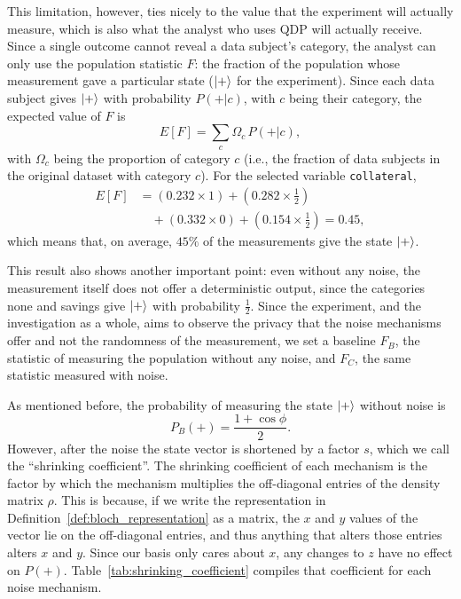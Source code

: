 \documentclass{ieeeaccess}
\begin{document}
This limitation, however, ties nicely to the value that the experiment will actually measure, which is also what the analyst who uses QDP will actually receive. Since a single outcome cannot reveal a data subject's category, the analyst can only use the population statistic $F$: the fraction of the population whose measurement gave a particular state ($\ket{+}$ for the experiment). Since each data subject gives $\ket{+}$ with probability $P(+|c)$, with $c$ being their category, the expected value of $F$ is
\begin{equation}
  E[F] = \sum_{c} \Omega_c \, P(+|c),
  \label{eq:expected_F}
\end{equation}
with $\Omega_c$ being the proportion of category $c$ (i.e., the fraction of data subjects in the original dataset with category $c$). For the selected variable \texttt{collateral},
\begin{align}
  E[F] &= (0.232 \times 1) + \left(0.282 \times \tfrac{1}{2}\right) \nonumber \\
  &\quad + (0.332 \times 0) + \left(0.154 \times \tfrac{1}{2}\right) = 0.45,
  \label{eq:expected_F_collateral}
\end{align}
which means that, on average, $45\%$ of the measurements give the state $\ket{+}$.

This result also shows another important point: even without any noise, the measurement itself does not offer a deterministic output, since the categories none and savings give $\ket{+}$ with probability $\frac{1}{2}$. Since the experiment, and the investigation as a whole, aims to observe the privacy that the noise mechanisms offer and not the randomness of the measurement, we set a baseline $F_B$, the statistic of measuring the population without any noise, and $F_C$, the same statistic measured with noise.

As mentioned before, the probability of measuring the state $\ket{+}$ without noise is
\begin{equation}
  P_B(+) = \frac{1+\cos\phi}{2}.
  \label{eq:p_b}
\end{equation}
However, after the noise the state vector is shortened by a factor $s$, which we call the ``shrinking coefficient''. The shrinking coefficient of each mechanism is the factor by which the mechanism multiplies the off-diagonal entries of the density matrix $\rho$. This is because, if we write the representation in Definition~\ref{def:bloch_representation} as a matrix, the $x$ and $y$ values of the vector lie on the off-diagonal entries, and thus anything that alters those entries alters $x$ and $y$. Since our basis only cares about $x$, any changes to $z$ have no effect on $P(+)$. Table~\ref{tab:shrinking_coefficient} compiles that coefficient for each noise mechanism.
\end{document}
